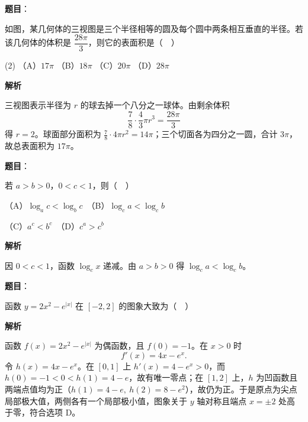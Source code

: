 \begin{answer}

\textbf{题目}：

如图，某几何体的三视图是三个半径相等的圆及每个圆中两条相互垂直的半径。若该几何体的体积是 \(\dfrac{28\pi}{3}\)，则它的表面积是（　）
\nopagebreak[4]
\begin{center}\end{center}
\nopagebreak[4]
\begin{gkopts}(2)
\task （A）\(17\pi\)
\task （B）\(18\pi\)
\task （C）\(20\pi\)
\task （D）\(28\pi\)
\end{gkopts}

\textbf{解析}

三视图表示半径为 \(r\) 的球去掉一个八分之一球体。由剩余体积
\nopagebreak[4]
\[
\frac78\cdot\frac43\pi r^3=\frac{28\pi}{3}
\]
得 \(r=2\)。球面部分面积为 \(\frac78\cdot4\pi r^2=14\pi\)；三个切面各为四分之一圆，合计 \(3\pi\)，故总表面积为 \(17\pi\)。


\end{answer}
\begin{answer}

\textbf{题目}：

若 \(a>b>0\)，\(0<c<1\)，则（　）

   （A）\(\log_a c<\log_b c\)　（B）\(\log_c a<\log_c b\)

   （C）\(a^c<b^c\)　（D）\(c^a>c^b\)

\textbf{解析}

因 \(0<c<1\)，函数 \(\log_c x\) 递减。由 \(a>b>0\) 得 \(\log_c a<\log_c b\)。


\end{answer}
\begin{answer}

\textbf{题目}：

函数 \(y=2x^2-e^{|x|}\) 在 \([-2,2]\) 的图象大致为（　）
\nopagebreak[4]
\begin{center}\end{center}
\nopagebreak[4]
\textbf{解析}

函数 \(f(x)=2x^2-e^{|x|}\) 为偶函数，且 \(f(0)=-1\)。在 \(x>0\) 时
\nopagebreak[4]
\[
f'(x)=4x-e^x.
\]
令 \(h(x)=4x-e^x\)。在 \([0,1]\) 上 \(h'(x)=4-e^x>0\)，而 \(h(0)=-1<0<h(1)=4-e\)，故有唯一零点；在 \([1,2]\) 上，\(h\) 为凹函数且两端点值均为正（\(h(1)=4-e,\ h(2)=8-e^2\)），故仍为正。于是原点为尖点局部极大值，两侧各有一个局部极小值，图象关于 \(y\) 轴对称且端点 \(x=\pm2\) 处高于零，符合选项 D。


\end{answer}
